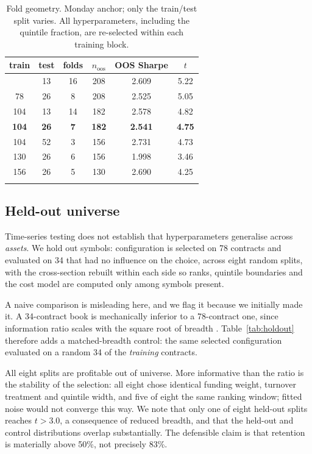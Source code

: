 \documentclass[11pt,letterpaper]{article}
\begin{document}
\begin{table}[!htbp]\centering
\caption{Fold geometry. Monday anchor; only the train/test split varies. All
hyperparameters, including the quintile fraction, are re-selected within each
training block.}
\label{tab:geom}
\begin{tabular}{cccccc}
\toprule
train & test & folds & $n_{\mathrm{oos}}$ & OOS Sharpe & $t$ \\
\midrule\addlinespace[2pt]
78 & 13 & 16 & 208 & 2.609 & 5.22 \\
78 & 26 & 8 & 208 & 2.525 & 5.05 \\
104 & 13 & 14 & 182 & 2.578 & 4.82 \\
\textbf{104} & \textbf{26} & \textbf{7} & \textbf{182} & \textbf{2.541} & \textbf{4.75} \\
104 & 52 & 3 & 156 & 2.731 & 4.73 \\
130 & 26 & 6 & 156 & 1.998 & 3.46 \\
156 & 26 & 5 & 130 & 2.690 & 4.25 \\
\addlinespace[2pt]
\bottomrule
\end{tabular}
\end{table}

\subsection{Held-out universe}

Time-series testing does not establish that hyperparameters generalise across
\emph{assets}. We hold out symbols: configuration is selected on 78 contracts and
evaluated on 34 that had no influence on the choice, across eight random splits,
with the cross-section rebuilt within each side so ranks, quintile boundaries and
the cost model are computed only among symbols present.

A naive comparison is misleading here, and we flag it because we initially made
it. A 34-contract book is mechanically inferior to a 78-contract one, since
information ratio scales with the square root of breadth \citep{grinold1989}.
Table~\ref{tab:holdout} therefore adds a matched-breadth control: the same
selected configuration evaluated on a random 34 of the \emph{training} contracts.

All eight splits are profitable out of universe. More informative than the ratio
is the stability of the selection: all eight chose identical funding weight,
turnover treatment and quintile width, and five of eight the same ranking window;
fitted noise would not converge this way. We note that only one of eight held-out
splits reaches $t>3.0$, a consequence of reduced breadth, and that the held-out
and control distributions overlap substantially. The defensible claim is that
retention is materially above 50\%, not precisely 83\%.
\end{document}
